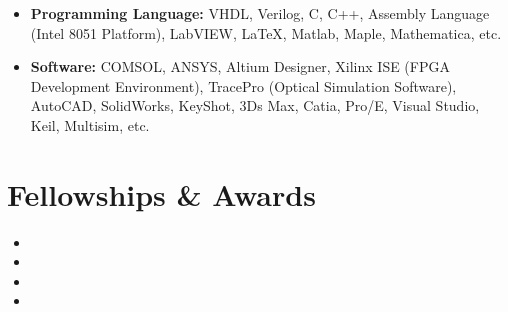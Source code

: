 \documentclass[11pt,a4paper,sans]{moderncv}         %
\begin{document}
    \begin{itemize}

    \item \textbf{Programming Language:} VHDL, Verilog, C, C++, Assembly Language (Intel 8051 Platform), LabVIEW, \LaTeX, Matlab, Maple, Mathematica, etc.

    \vspace{2pt}

    \item \textbf{Software:} COMSOL, ANSYS, Altium Designer, Xilinx ISE (FPGA Development Environment), TracePro (Optical Simulation Software), AutoCAD, SolidWorks, KeyShot, 3Ds Max, Catia, Pro/E, Visual Studio, Keil, Multisim, etc.

\end{itemize}

\section{Fellowships \& Awards}

\vspace{3pt}

\begin{itemize}

    \item{}  

    \item{}  

    \item{}

    \item{}

\end{itemize}
\end{document}
